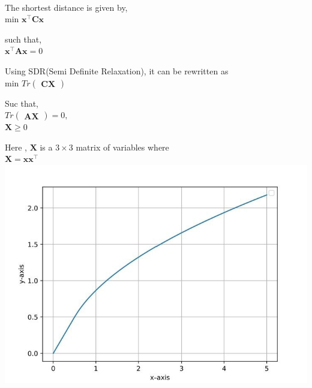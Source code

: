 \documentclass[8pt,a4paper]{report}
\newcommand{\myvec}[1]{\ensuremath{\begin{pmatrix}#1\end{pmatrix}}}
\let\vec\mathbf
\begin{document}
\begin{multicols}{2}
	\\ \raggedright The shortest distance is given by,
	\\ \centering min $\vec{x^{\top}}\vec{C}\vec{x}$
	\\ \raggedright such that,          \\ \centering $\vec{x^{\top}}\vec{A}\vec{x} = 0$
	\\ \raggedright Using SDR(Semi Definite Relaxation), it can be rewritten as 
	\\ \centering min $Tr\myvec{\vec{C}\vec{X}}$
	\\ \raggedright Suc that, 
	\\ \centering $ Tr\myvec{\vec{A}\vec{X}} =0,$
	\\ \centering $\vec{X}\ge0$
	\\ \raggedright Here , $\vec{X}$ is a  $3\times3$ matrix of variables where
	\\ \centering $ \vec{X} = \vec{x}\vec{x^{\top}}$
\centering \includegraphics[width=1\columnwidth]{opt.jpg}
\end{multicols}
\end{document}
